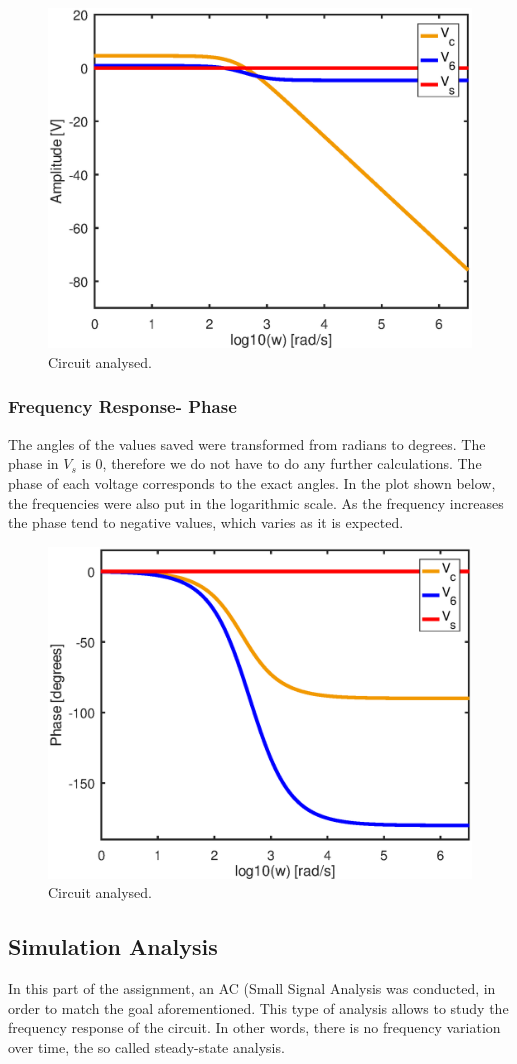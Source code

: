 \begin{figure}[h] \centering
\includegraphics[width=0.9\linewidth]{part6_amp.eps}
\caption{Circuit analysed.}
\label{RC Circuit.}
\end{figure}

\subsubsection{Frequency Response- Phase}


The angles of the values saved were transformed from radians to degrees. The phase in $V_s$ is 0, therefore we do not have to do any further calculations. The phase of each voltage corresponds to the exact angles. In the plot shown below, the frequencies were also  put in the logarithmic scale. As the frequency increases the phase tend to negative values, which varies as it is expected.

\begin{figure}[h] \centering
\includegraphics[width=0.4\linewidth]{part6_ang.eps}
\caption{Circuit analysed.}
\label{RC Circuit.}
\end{figure}

\subsection{Simulation Analysis}
In this part of the assignment, an AC (Small Signal Analysis was conducted, in order to match the goal aforementioned. This type of analysis allows to study the frequency response of the circuit. In other words, there is no frequency variation over time, the so called steady-state analysis.


